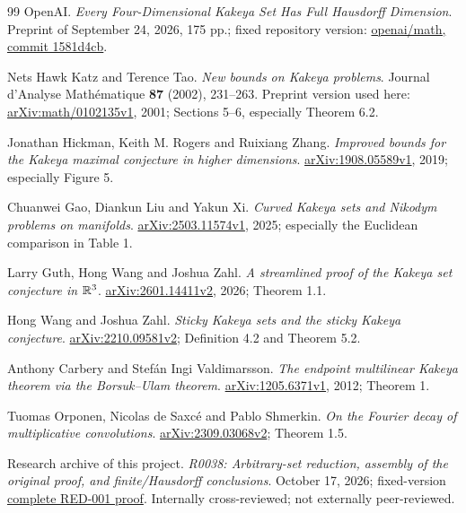 \begin{thebibliography}{99}
OpenAI.
\emph{Every Four-Dimensional Kakeya Set Has Full Hausdorff Dimension}.
Preprint of September 24, 2026, 175 pp.; fixed repository version:
\href{https://github.com/openai/math/tree/1581d4cbdd69a0faf34b2089614fe2a814316a6a/preprints/Every-four-dimensional-Kakeya-set-has-full-Hausdorff-dimension-September-24-2026}{openai/math, commit 1581d4cb}.

Nets Hawk Katz and Terence Tao.
\emph{New bounds on Kakeya problems}.
Journal d'Analyse Math\'ematique \textbf{87} (2002), 231--263.
Preprint version used here: \href{https://arxiv.org/abs/math/0102135v1}{arXiv:math/0102135v1}, 2001;
Sections 5--6, especially Theorem 6.2.

Jonathan Hickman, Keith M. Rogers and Ruixiang Zhang.
\emph{Improved bounds for the Kakeya maximal conjecture in higher dimensions}.
\href{https://arxiv.org/abs/1908.05589v1}{arXiv:1908.05589v1}, 2019; especially Figure 5.

Chuanwei Gao, Diankun Liu and Yakun Xi.
\emph{Curved Kakeya sets and Nikodym problems on manifolds}.
\href{https://arxiv.org/abs/2503.11574v1}{arXiv:2503.11574v1}, 2025;
especially the Euclidean comparison in Table 1.

Larry Guth, Hong Wang and Joshua Zahl.
\emph{A streamlined proof of the Kakeya set conjecture in $\mathbb R^3$}.
\href{https://arxiv.org/abs/2601.14411v2}{arXiv:2601.14411v2}, 2026; Theorem 1.1.

Hong Wang and Joshua Zahl.
\emph{Sticky Kakeya sets and the sticky Kakeya conjecture}.
\href{https://arxiv.org/abs/2210.09581v2}{arXiv:2210.09581v2}; Definition 4.2 and Theorem 5.2.

Anthony Carbery and Stef\'an Ingi Valdimarsson.
\emph{The endpoint multilinear Kakeya theorem via the Borsuk--Ulam theorem}.
\href{https://arxiv.org/abs/1205.6371v1}{arXiv:1205.6371v1}, 2012; Theorem 1.

Tuomas Orponen, Nicolas de Saxc\'e and Pablo Shmerkin.
\emph{On the Fourier decay of multiplicative convolutions}.
\href{https://arxiv.org/abs/2309.03068v2}{arXiv:2309.03068v2}; Theorem 1.5.

Research archive of this project.
\emph{R0038: Arbitrary-set reduction, assembly of the original proof, and finite/Hausdorff conclusions}.
October 17, 2026; fixed-version
\href{https://github.com/lixiang90/kakeya_research/blob/774c3614ec3e810c127c875a9f5abb60748be848/notes/10_source_audit/source_assembly/R0038_reduction_source_assembly_and_finite_readout_full_proof.md}{complete RED-001 proof}.
Internally cross-reviewed; not externally peer-reviewed.


\end{thebibliography}
